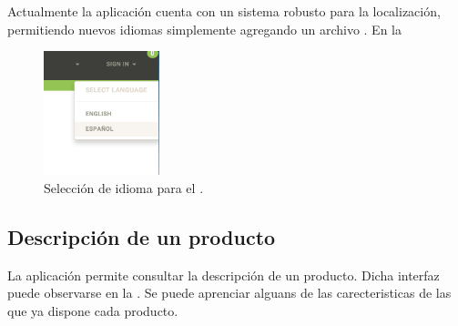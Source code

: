 Actualmente la aplicación cuenta con un sistema robusto para la localización, permitiendo nuevos idiomas simplemente agregando un archivo \jsonNAME. En la 


\begin{figure}[H]
	\centering
	\includegraphics[width=0.3\textwidth]{figuras/languages_available.png}

	\caption{Selección de idioma para el \websitesINT.}
	\label{figure:features:languages_available}
\end{figure}


\subsection{Descripción de un producto}

La aplicación permite consultar la descripción de un producto. Dicha interfaz puede observarse en la . Se puede aprenciar alguans de las carecteristicas de las que ya dispone cada producto.

